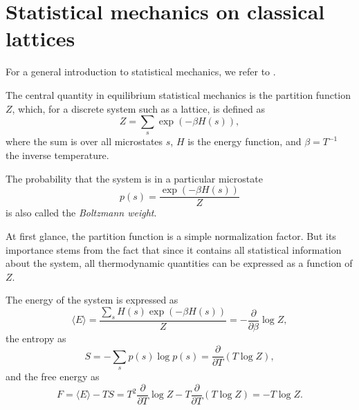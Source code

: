 
\section{Statistical mechanics on classical lattices}
For a general introduction to statistical mechanics, we refer to \cite{tong2011lectures}.

The central quantity in equilibrium statistical mechanics is the partition
function $Z$, which, for a discrete system such as a lattice, is defined as
\begin{equation}
  Z = \sum_{s} \exp{(-\beta H(s))},
\end{equation}
where the sum is over all microstates $s$, $H$ is the energy function, and
$\beta = T^{-1}$ the inverse temperature.

The probability that the system is in a particular microstate
\begin{equation}
  p(s) = \frac{\exp (-\beta H(s)) }{Z}
\end{equation}
is also called the \emph{Boltzmann weight}.

At first glance, the partition function is a simple normalization factor.
But its importance stems from the fact that since it contains all statistical information about the system,
all thermodynamic quantities can be expressed as a function of $Z$.

The energy of the system is expressed as
\begin{equation}
  \langle E \rangle = \frac{\sum_{s} H(s) \exp{(-\beta H(s))}}{Z} = -\frac{\partial}{\partial \beta} \log Z,
\end{equation}
the entropy as
\begin{equation}
  S = - \sum_{s} p(s) \log p(s) = \frac{\partial}{\partial T}(T \log Z),
\end{equation}
and the free energy as
\begin{equation}
  F = \langle E \rangle - TS = T^2 \frac{\partial}{\partial T} \log Z - T \frac{\partial}{\partial T}(T \log Z) = -T \log Z.
\end{equation}





